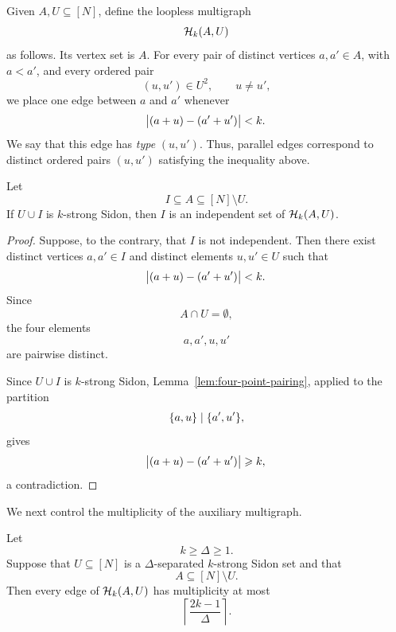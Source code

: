 \documentclass[reqno,a4paper,12pt]{amsart}
\begin{document}


\begin{definition}
    \label{def:auxiliary-multigraph}
    Given \(A,U\subseteq[N]\), define the loopless multigraph
    \[
        \mathcal{H}_k(A,U)
    \]
    as follows. Its vertex set is \(A\). For every pair of distinct
    vertices \(a,a'\in A\), with \(a<a'\), and every ordered pair
    \[
        (u,u')\in U^2,
        \qquad
        u\neq u',
    \]
    we place one edge between \(a\) and \(a'\) whenever
    \[
        \abs{(a+u)-(a'+u')}<k.
    \]
    We say that this edge has \emph{type} \((u,u')\). Thus, parallel
    edges correspond to distinct ordered pairs \((u,u')\) satisfying
    the inequality above.
\end{definition}

\begin{proposition}
    \label{prop:sidon-independent}
    Let
    \[
        I\subseteq A\subseteq[N]\setminus U.
    \]
    If \(U\cup I\) is \(k\)-strong Sidon, then \(I\) is an independent
    set of \(\mathcal{H}_k(A,U)\).
\end{proposition}

\begin{proof}
    Suppose, to the contrary, that \(I\) is not independent. Then there
    exist distinct vertices \(a,a'\in I\) and distinct elements
    \(u,u'\in U\) such that
    \[
        \abs{(a+u)-(a'+u')}<k.
    \]
    Since
    \[
        A\cap U=\emptyset,
    \]
    the four elements
    \[
        a,a',u,u'
    \]
    are pairwise distinct.

    Since \(U\cup I\) is \(k\)-strong Sidon,
    Lemma~\ref{lem:four-point-pairing}, applied to the partition
    \[
        \lbrace a,u\rbrace
        \mid
        \lbrace a',u'\rbrace,
    \]
    gives
    \[
        \abs{(a+u)-(a'+u')}\geqslant k,
    \]
    a contradiction.
\end{proof}

We next control the multiplicity of the auxiliary multigraph.

\begin{proposition}
    \label{prop:multiplicity}
    Let
    \[
        k\geq\Delta\geq1.
    \]
    Suppose that \(U\subseteq[N]\) is a \(\Delta\)-separated
    \(k\)-strong Sidon set and that
    \[
        A\subseteq[N]\setminus U.
    \]
    Then every edge of \(\mathcal{H}_k(A,U)\) has multiplicity at most
    \[
        \left\lceil\frac{2k-1}{\Delta}\right\rceil.
    \]
\end{proposition}
\end{document}

